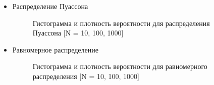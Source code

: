 \begin{itemize}
	\item{Распределение Пуассона}
	\begin{figure}[H]
		\caption{Гистограмма и плотность вероятности для распределения Пуассона [N = 10, 100, 1000]}
		\label{fig:hist_poisson}
	\end{figure}
	
	\item{Равномерное распределение}
	\begin{figure}[H]
		\caption{Гистограмма и плотность вероятности для равномерного распределения [N = 10, 100, 1000]}
		\label{fig:hist_uniform}
	\end{figure}

\end{itemize}
